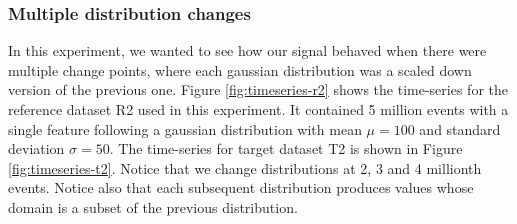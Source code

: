 \subsubsection{Multiple distribution changes}
In this experiment, we wanted to see how our signal behaved when there were multiple change points, where each gaussian distribution was a scaled down version of the previous one. Figure \ref{fig:timeseries-r2} shows the time-series for the reference dataset R2 used in this experiment. It contained 5 million events with a single feature following a gaussian distribution with mean $\mu=100$ and standard deviation $\sigma=50$. The time-series for target dataset T2 is shown in Figure \ref{fig:timeseries-t2}. Notice that we change distributions at 2, 3 and 4 millionth events. Notice also that each subsequent distribution produces values whose domain is a subset of the previous distribution.
